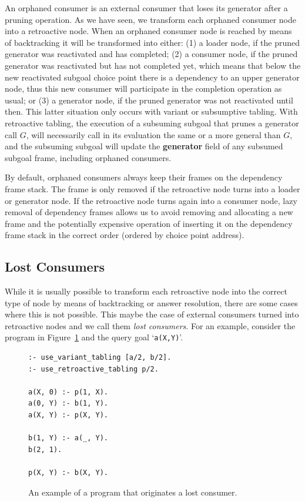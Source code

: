 An orphaned consumer is an external consumer that loses its generator after a pruning operation.
As we have seen, we transform each orphaned consumer node into a retroactive node.
When an orphaned consumer node is reached by means of backtracking it will be transformed into either:
(1) a loader node, if the pruned generator was reactivated and has completed; (2) a consumer node,
if the pruned generator was reactivated but has not completed yet, which means that below the new
reactivated subgoal choice point there is a dependency to an upper generator node, thus this new
consumer will participate in the completion operation as usual; or (3) a generator node,
if the pruned generator was not reactivated until then. This latter situation only occurs with
variant or subsumptive tabling. With retroactive tabling, the execution of a subsuming subgoal
that prunes a generator call $G$, will necessarily call in its evaluation the same or a more general
than $G$, and the subsuming subgoal will update the \textbf{generator} field
of any subsumed subgoal frame, including orphaned consumers.

By default, orphaned consumers always keep their frames on the dependency frame stack. The frame is only
removed if the retroactive node turns into a loader or generator node. If the retroactive node turns again
into a consumer node, lazy removal of dependency frames allows us to avoid removing and allocating a new
frame and the potentially expensive operation of inserting it on the dependency frame stack in the
correct order (ordered by choice point address).

\subsection{Lost Consumers}

While it is usually possible to transform each retroactive node into the correct type of node by means
of backtracking or answer resolution, there are some cases where this is not possible. This maybe the case of
external consumers turned into retroactive nodes and we call them \textit{lost consumers}.
For an example, consider the program in Figure~\ref{fig:retro_lost_consumer_code} and the query goal
`\texttt{a(X,Y)}'.

\begin{figure}[ht]
\begin{Verbatim}
:- use_variant_tabling [a/2, b/2].
:- use_retroactive_tabling p/2.

a(X, 0) :- p(1, X).
a(0, Y) :- b(1, Y).
a(X, Y) :- p(X, Y).

b(1, Y) :- a(_, Y).
b(2, 1).

p(X, Y) :- b(X, Y).
\end{Verbatim}
\caption{An example of a program that originates a lost consumer.}
\label{fig:retro_lost_consumer_code}
\end{figure}

